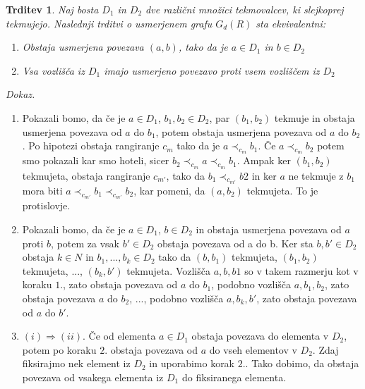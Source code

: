 \documentclass[a4paper, 12pt]{book}
\newtheorem{trditev}{Trditev}[chapter]
\newenvironment{dokaz}{\emph{Dokaz.}\ }{\hspace{\fill}{$\Box$}}
\begin{document}
\begin{trditev}
\label{trditev_ekvivalenc_mnozic_tekmovalcev_ki_slejkoprej_tekmujejo}
    Naj bosta $D_1$ in $D_2$ dve različni množici tekmovalcev, ki slejkoprej tekmujejo. Naslednji trditvi o usmerjenem grafu $G_d(R)$ sta ekvivalentni:
    \begin{enumerate}[label=(\roman*)]
        \item Obstaja usmerjena povezava $(a, b)$, tako da je $a \in D_1$ in $b \in D_2$
        \item Vsa vozlišča iz $D_1$ imajo usmerjeno povezavo proti vsem vozliščem iz $D_2$
    \end{enumerate}
\end{trditev}
\begin{dokaz}
    \begin{enumerate}
        \item Pokazali bomo, da če je $a \in D_1$, $b_1, b_2 \in D_2$, par $(b_1, b_2)$ tekmuje in obstaja usmerjena povezava od $a$ do $b_1$, potem obstaja usmerjena povezava od $a$ do $b_2$. Po hipotezi obstaja rangiranje $c_m$ tako da je $a \prec_{c_m} b_1$. Če $a \prec_{c_m} b_2$ potem smo pokazali kar smo hoteli, sicer $b_2 \prec_{c_m} a \prec_{c_m} b_1$. Ampak ker $(b_1, b_2)$ tekmujeta, obstaja rangiranje $c_{m'}$, tako da $b_1 \prec_{c_{m'}} b2$ in ker $a$ ne tekmuje z $b_1$ mora biti $a \prec_{c_{m'}} b_1 \prec_{c_{m'}} b_2$, kar pomeni, da $(a, b_2)$ tekmujeta. To je protislovje.
        \item Pokazali bomo, da če je $a \in D_1$, $b \in D_2$ in obstaja usmerjena povezava od $a$ proti $b$, potem za vsak $b' \in D_2$ obstaja povezava od a do b. Ker sta $b, b' \in D_2$ obstaja $k \in N$ in $b_1, ..., b_k \in D_2$ tako da $(b, b_1)$ tekmujeta, $(b_1, b_2)$ tekmujeta, ..., $(b_k, b')$ tekmujeta. Vozlišča $a, b, b1$ so v takem razmerju kot v koraku $1.$, zato obstaja povezava od $a$ do $b_1$, podobno vozlišča $a, b_1, b_2$, zato obstaja povezava $a$ do $b_2$, ..., podobno vozlišča $a, b_k, b'$, zato obstaja povezava od $a$ do $b'$.
        \item $(i) \Rightarrow (ii)$. Če od elementa $a \in D_1$ obstaja povezava do elementa v $D_2$, potem po koraku $2.$ obstaja povezava od $a$ do vseh elementov v $D_2$. Zdaj fiksirajmo nek element iz $D_2$ in uporabimo korak $2.$. Tako dobimo, da obstaja povezava od vsakega elementa iz $D_1$ do fiksiranega elementa.        
    \end{enumerate}
\end{dokaz}
\end{document}
